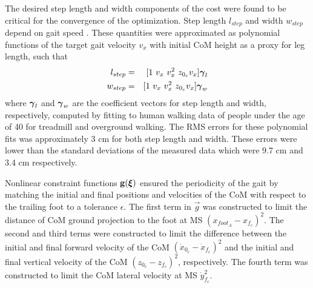 The desired step length and width components of the cost were found to be critical for the convergence of the optimization. Step length $ l_{step} $ and width $ w_{step} $ depend on gait speed \cite{andriacchi1977walking}. These quantities were approximated as polynomial functions of the target gait velocity $ v_x $ with initial CoM height as a proxy for leg length, such that
\begin{eqnarray}
	l_{step} &=& [1\ v_x\ v_x^2\ z_{0_{c}} v_x] \boldsymbol{\gamma}_l \\
	w_{step} &=& [1\ v_x\ v_x^2\ z_{0_{c}} v_x] \boldsymbol{\gamma}_w
\end{eqnarray}
%
where $ \boldsymbol{\gamma}_l $ and $ \boldsymbol{\gamma}_w $ are the coefficient vectors for step length and width, respectively, computed by fitting to human walking data of people under the age of 40 for treadmill and overground walking. The RMS errors for these polynomial fits was approximately 3 cm for both step length and width. These errors were lower than the standard deviations of the measured data which were 9.7 cm and 3.4 cm respectively.
%

Nonlinear constraint functions $ \mathbf{g}(\boldsymbol{\xi}) $ ensured the periodicity of the gait by matching the initial and final positions and velocities of the CoM with respect to the trailing foot to a tolerance $ \epsilon $. The first term in $ \vec{g} $ was constructed to limit the distance of CoM ground projection to the foot at MS $ (x_{foot_A} - x_{f_{c}})^2  $. The second and third terms were constructed to limit the difference between the initial and final forward velocity of the CoM $ (\dot{x}_{0_{c}} - \dot{x}_{f_{c}} )^2 $ and the initial and final vertical velocity of the CoM $ (z_{0_{c}} - z_{f_{c}})^2 $, respectively. The fourth term was constructed to limit the CoM lateral velocity at MS $ \dot{y}_{f_{c}}^2 $.
%	

